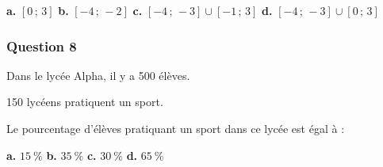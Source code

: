 \documentclass[10pt]{article}
\begin{document}
\textbf{a.} $[0\,;\,3]$ \hfill \textbf{b.} $[-4\,;\,-2]$ \hfill \textbf{c.} $[-4\,;\,-3]\cup[-1\,;\,3]$ \hfill \textbf{d.} $[-4\,;\,-3]\cup[0\,;\,3]$

\subsubsection*{Question 8}
Dans le lycée Alpha, il y a 500 élèves.

150 lycéens pratiquent un sport.

Le pourcentage d'élèves pratiquant un sport dans ce lycée est égal à :

\textbf{a.} $15\ \%$ \hfill \textbf{b.} $35\ \%$ \hfill \textbf{c.} $30\ \%$ \hfill \textbf{d.} $65\ \%$




\begin{center}
\end{center}
\end{document}
